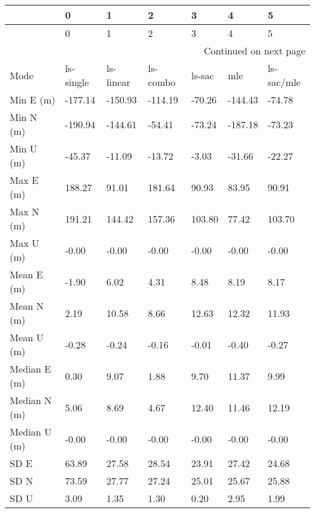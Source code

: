 \begin{longtable}{lllllll}
\toprule
{} &          0 &          1 &         2 &       3 &        4 &           5 \\
\midrule
\endfirsthead

\toprule
{} &          0 &          1 &         2 &       3 &        4 &           5 \\
\midrule
\endhead
\midrule
\multicolumn{7}{r}{{Continued on next page}} \\
\midrule
\endfoot

\bottomrule
\endlastfoot
Mode              &  ls-single &  ls-linear &  ls-combo &  ls-sac &      mle &  ls-sac/mle \\
Min E (m)         &    -177.14 &    -150.93 &   -114.19 &  -70.26 &  -144.43 &      -74.78 \\
Min N (m)         &    -190.94 &    -144.61 &    -54.41 &  -73.24 &  -187.18 &      -73.23 \\
Min U (m)         &     -45.37 &     -11.09 &    -13.72 &   -3.03 &   -31.66 &      -22.27 \\
Max E (m)         &     188.27 &      91.01 &    181.64 &   90.93 &    83.95 &       90.91 \\
Max N (m)         &     191.21 &     144.42 &    157.36 &  103.80 &    77.42 &      103.70 \\
Max U (m)         &      -0.00 &      -0.00 &     -0.00 &   -0.00 &    -0.00 &       -0.00 \\
Mean E (m)        &      -1.90 &       6.02 &      4.31 &    8.48 &     8.19 &        8.17 \\
Mean N (m)        &       2.19 &      10.58 &      8.66 &   12.63 &    12.32 &       11.93 \\
Mean U (m)        &      -0.28 &      -0.24 &     -0.16 &   -0.01 &    -0.40 &       -0.27 \\
Median E (m)      &       0.30 &       9.07 &      1.88 &    9.70 &    11.37 &        9.99 \\
Median N (m)      &       5.06 &       8.69 &      4.67 &   12.40 &    11.46 &       12.19 \\
Median U (m)      &      -0.00 &      -0.00 &     -0.00 &   -0.00 &    -0.00 &       -0.00 \\
SD E              &      63.89 &      27.58 &     28.54 &   23.91 &    27.42 &       24.68 \\
SD N              &      73.59 &      27.77 &     27.24 &   25.01 &    25.67 &       25.88 \\
SD U              &       3.09 &       1.35 &      1.30 &    0.20 &     2.95 &        1.99 \\

\end{longtable}
